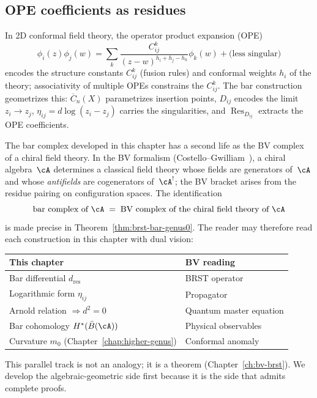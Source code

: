 \subsection{OPE coefficients as residues}

\begin{remark}\label{rem:physical-genesis}
In 2D conformal field theory, the operator product expansion (OPE)
\[\phi_i(z)\phi_j(w) = \sum_{k} \frac{C_{ij}^k}{(z-w)^{h_i+h_j-h_k}} \phi_k(w) + \text{(less singular)}\]
encodes the structure constants $C_{ij}^k$ (fusion rules) and conformal weights $h_i$ of the theory; associativity of multiple OPEs constrains the $C_{ij}^k$.
The bar construction geometrizes this: $\overline{C}_n(X)$ parametrizes insertion points, $D_{ij}$ encodes the limit $z_i \to z_j$, $\eta_{ij} = d\log(z_i - z_j)$ carries the singularities, and $\operatorname{Res}_{D_{ij}}$ extracts the OPE coefficients.
\end{remark}

\begin{remark}\label{rem:bv-parallel-track}
The bar complex developed in this chapter has a second life as the
BV complex of a chiral field theory.  In the BV formalism
(Costello--Gwilliam~\cite{CG17}), a chiral algebra~$\cA$ determines a
classical field theory whose fields are generators of~$\cA$ and whose
\emph{antifields} are cogenerators of~$\cA^!$; the BV bracket arises from
the residue pairing on configuration spaces.  The identification
\[
\text{bar complex of } \cA
\;=\; \text{BV complex of the chiral field theory of } \cA
\]
is made precise in Theorem~\ref{thm:brst-bar-genus0}.  The reader
may therefore read each construction in this chapter with dual vision:

\begin{center}
\small
\begin{tabular}{ll}
\textbf{This chapter} & \textbf{BV reading} \\ \hline
Bar differential $d_{\mathrm{res}}$ & BRST operator \\
Logarithmic form $\eta_{ij}$ & Propagator \\
Arnold relation $\Rightarrow d^2 = 0$ & Quantum master equation \\
Bar cohomology $H^*(\bar{B}(\cA))$ & Physical observables \\
Curvature $m_0$ (Chapter~\ref{chap:higher-genus}) & Conformal anomaly
\end{tabular}
\end{center}
\noindent
This parallel track is not an analogy; it is a theorem
(Chapter~\ref{ch:bv-brst}).  We develop the algebraic-geometric
side first because it is the side that admits complete proofs.
\end{remark}

